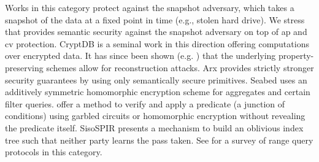 			Works in this category protect against the snapshot adversary, which takes a snapshot of the data at a fixed point in time (e.g., stolen hard drive).
			We stress that \epsolute{} provides semantic security against the snapshot adversary on top of \acrshort{ap} and \acrshort{cv} protection.
			CryptDB \cite{crypt-db} is a seminal work in this direction offering computations over encrypted data.
			It has since been shown (e.g. \cite{inference-attacks-naveed-15,inference-attack-islam-14,attacks-tao-of-inference}) that the underlying property-preserving schemes allow for reconstruction attacks.
			Arx \cite{arx} provides strictly stronger security guarantees by using only semantically secure primitives.
			Seabed \cite{seabed} uses an additively symmetric homomorphic encryption scheme for aggregates and certain filter queries.
			\textcite{ppqed} offer a method to verify and apply a predicate (a junction of conditions) using garbled circuits or homomorphic encryption without revealing the predicate itself.
			SisoSPIR \cite{sisospir} presents a mechanism to build an oblivious index tree such that neither party learns the pass taken.
			See \cite{ore-benchmark-17} for a survey of range query protocols in this category. %
